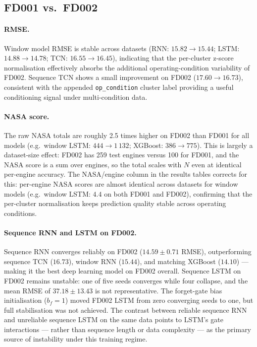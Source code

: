 \documentclass[a4paper,11pt]{article}
\begin{document}
\subsection{FD001 vs.\ FD002}

\paragraph{RMSE.}
Window model RMSE is stable across datasets (RNN: $15.82 \to 15.44$; LSTM: $14.88 \to 14.78$; TCN: $16.55 \to 16.45$), indicating that the per-cluster z-score normalisation effectively absorbs the additional operating-condition variability of FD002.
Sequence TCN shows a small improvement on FD002 ($17.60 \to 16.73$), consistent with the appended \texttt{op\_condition} cluster label providing a useful conditioning signal under multi-condition data.

\paragraph{NASA score.}
The raw NASA totals are roughly 2.5 times higher on FD002 than FD001 for all models (e.g.\ window LSTM: $444 \to 1\,132$; XGBoost: $386 \to 775$).
This is largely a dataset-size effect: FD002 has 259 test engines versus 100 for FD001, and the NASA score is a sum over engines, so the total scales with $N$ even at identical per-engine accuracy.
The NASA/engine column in the results tables corrects for this: per-engine NASA scores are almost identical across datasets for window models (e.g.\ window LSTM: $4.4$ on both FD001 and FD002), confirming that the per-cluster normalisation keeps prediction quality stable across operating conditions.

\paragraph{Sequence RNN and LSTM on FD002.}
Sequence RNN converges reliably on FD002 ($14.59 \pm 0.71$ RMSE), outperforming sequence TCN ($16.73$), window RNN ($15.44$), and matching XGBoost ($14.10$) — making it the best deep learning model on FD002 overall.
Sequence LSTM on FD002 remains unstable: one of five seeds converges while four collapse, and the mean RMSE of $37.18 \pm 13.43$ is not representative.
The forget-gate bias initialisation ($b_f=1$) moved FD002 LSTM from zero converging seeds to one, but full stabilisation was not achieved.
The contrast between reliable sequence RNN and unreliable sequence LSTM on the same data points to LSTM's gate interactions — rather than sequence length or data complexity — as the primary source of instability under this training regime.
\end{document}
